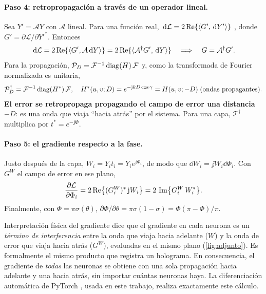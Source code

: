 \paragraph{Paso 4: retropropagación a través de un operador lineal.} Sea $Y'=\mathcal{A}Y$
con $\mathcal{A}$ lineal. Para una función real, $\,\mathrm{d}\mathcal{L}=2\operatorname{Re}\{\langle G',\,\mathrm{d} Y'\rangle\}$
\parencite{kreutzdelgado2009}, donde $G'=\partial\mathcal{L}/\partial Y'^*$. Entonces
\begin{equation}
  \,\mathrm{d}\mathcal{L}=2\operatorname{Re}\{\langle G',\mathcal{A}\,\mathrm{d} Y\rangle\}
               =2\operatorname{Re}\{\langle \mathcal{A}^\dagger G',\,\mathrm{d} Y\rangle\}
  \quad\Longrightarrow\quad
  G=\mathcal{A}^\dagger G' .
  \label{eq:paso4}
\end{equation}
Para la propagación, $\mathcal{P}_D=\mathcal{F}^{-1}\,\mathrm{diag}(H)\,\mathcal{F}$ y, como la transformada de
Fourier normalizada es unitaria,
\begin{equation}
  \mathcal{P}_D^\dagger=\mathcal{F}^{-1}\,\mathrm{diag}(H^*)\,\mathcal{F},\quad
  H^*(u,v;D)=e^{-\mathrm{j} kD\cos\gamma}=H(u,v;-D)\;(\text{ondas propagantes}).
  \label{eq:adjunto}
\end{equation}
\textbf{El error se retropropaga propagando el campo de error una distancia $-D$}: es una
onda que viaja ``hacia atrás'' por el sistema. Para una capa, $\mathcal{T}^\dagger$ multiplica
por $t^*=e^{-\jj\Phi}$.

\paragraph{Paso 5: el gradiente respecto a la fase.} Justo después de la capa,
$W_i=Y_it_i=Y_ie^{\jj\Phi_i}$, de modo que $\dd W_i=\jj W_i\dd\Phi_i$. Con $G^W$ el campo de
error en ese plano,
\begin{equation}
  \frac{\partial\mathcal{L}}{\partial\Phi_i}
  =2\operatorname{Re}\bigl\{(G^W_i)^*\,\mathrm{j} W_i\bigr\}
  =2\,\operatorname{Im}\bigl\{G^W_i\,W_i^*\bigr\}.
  \label{eq:gradiente}
\end{equation}
Finalmente, con $\Phi=\pi\sigma(\theta)$, $\partial\Phi/\partial\theta=\pi\sigma(1-\sigma)=\Phi(\pi-\Phi)/\pi$.

\begin{resultado}{Interpretación física del gradiente}
 dice que el gradiente en cada neurona es un \emph{término de
interferencia} entre la onda que viaja hacia adelante ($W$) y la onda de error que viaja
hacia atrás ($G^W$), evaluadas en el mismo plano (\cref{fig:adjunto}). Es formalmente el mismo
producto que registra un holograma. En consecuencia, el gradiente de \emph{todas} las
neuronas se obtiene con una sola propagación hacia adelante y una hacia atrás, sin importar
cuántas neuronas haya. La diferenciación automática de PyTorch \parencite{paszke2019}, usada
en este trabajo, realiza exactamente este cálculo.
\end{resultado}

